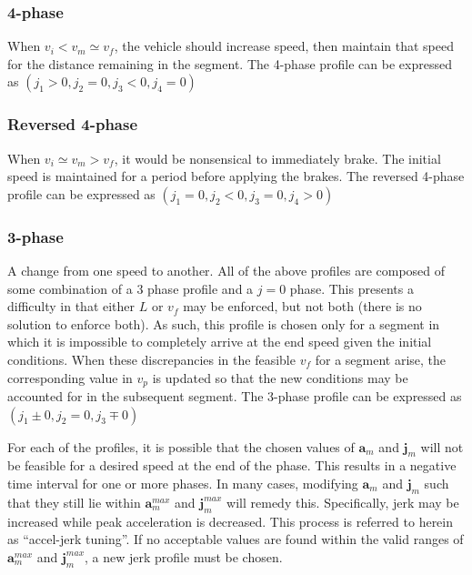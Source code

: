 \documentclass[letterpaper, 10 pt, conference]{ieeeconf}  %
\begin{document}
\subsubsection{4-phase} \label{sec:4phase}

When $v_i < v_m \simeq v_f$, the vehicle should increase speed, then maintain that speed for the distance remaining in the segment.
The 4-phase profile can be expressed as $( j_1 > 0, j_2 = 0 , j_3 < 0, j_4 = 0 )$


\subsubsection{Reversed 4-phase} \label{sec:reversed4phase}

When $v_i \simeq v_m > v_f$, it would be nonsensical to immediately brake.
The initial speed is maintained for a period before applying the brakes.
The reversed 4-phase profile can be expressed as $( j_1 = 0, j_2 < 0, j_3 = 0 , j_4 > 0 )$

\subsubsection{3-phase} \label{sec:3phase}

A change from one speed to another.
All of the above profiles are composed of some combination of a 3 phase profile and a $j = 0$ phase.
This presents a difficulty in that either $L$ or $v_f$ may be enforced, but not both (there is no solution to enforce both).
As such, this profile is chosen only for a segment in which it is impossible to completely arrive at the end speed given the initial conditions.
When these discrepancies in the feasible $v_f$ for a segment arise, the corresponding value in $v_p$ is updated so that the new conditions may be accounted for in the subsequent segment.
The 3-phase profile can be expressed as $(j_1 \pm 0 , j_2 = 0, j_3 \mp 0 )$

For each of the profiles, it is possible that the chosen values of $\mathbf{a}_m$ and $\mathbf{j}_m$ will not be feasible for a desired speed at the end of the phase.
This results in a negative time interval for one or more phases.
In many cases, modifying $\mathbf{a}_m$ and $\mathbf{j}_m$ such that they still lie within $\mathbf{a}^{max}_m$ and $\mathbf{j}^{max}_m$ will remedy this.
Specifically, jerk may be increased while peak acceleration is decreased.
This process is referred to herein as ``accel-jerk tuning''.
If no acceptable values are found within the valid ranges of $\mathbf{a}^{max}_m$ and $\mathbf{j}^{max}_m$, a new jerk profile must be chosen.
\end{document}
